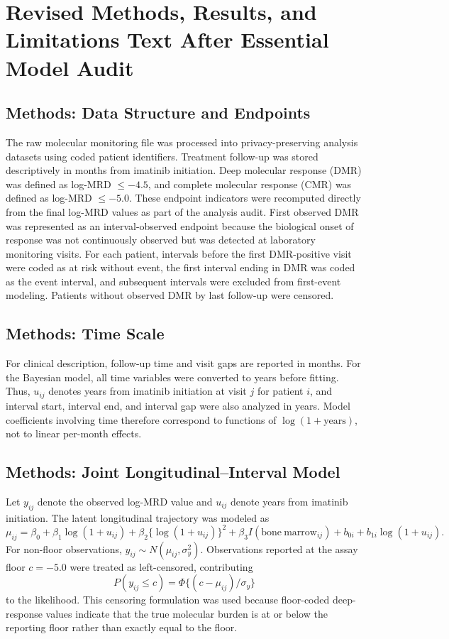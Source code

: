 \section*{Revised Methods, Results, and Limitations Text After Essential Model Audit}

\subsection*{Methods: Data Structure and Endpoints}

The raw molecular monitoring file was processed into privacy-preserving analysis datasets using coded patient identifiers. Treatment follow-up was stored descriptively in months from imatinib initiation. Deep molecular response (DMR) was defined as log-MRD \(\leq -4.5\), and complete molecular response (CMR) was defined as log-MRD \(\leq -5.0\). These endpoint indicators were recomputed directly from the final log-MRD values as part of the analysis audit. First observed DMR was represented as an interval-observed endpoint because the biological onset of response was not continuously observed but was detected at laboratory monitoring visits. For each patient, intervals before the first DMR-positive visit were coded as at risk without event, the first interval ending in DMR was coded as the event interval, and subsequent intervals were excluded from first-event modeling. Patients without observed DMR by last follow-up were censored.

\subsection*{Methods: Time Scale}

For clinical description, follow-up time and visit gaps are reported in months. For the Bayesian model, all time variables were converted to years before fitting. Thus, \(u_{ij}\) denotes years from imatinib initiation at visit \(j\) for patient \(i\), and interval start, interval end, and interval gap were also analyzed in years. Model coefficients involving time therefore correspond to functions of \(\log(1+\mathrm{years})\), not to linear per-month effects.

\subsection*{Methods: Joint Longitudinal--Interval Model}

Let \(y_{ij}\) denote the observed log-MRD value and \(u_{ij}\) denote years from imatinib initiation. The latent longitudinal trajectory was modeled as
\[
\mu_{ij} =
\beta_0 + \beta_1 \log(1+u_{ij})
+ \beta_2\{\log(1+u_{ij})\}^2
+ \beta_3 I(\mathrm{bone\ marrow}_{ij})
+ b_{0i} + b_{1i}\log(1+u_{ij}).
\]
For non-floor observations, \(y_{ij}\sim N(\mu_{ij},\sigma_y^2)\). Observations reported at the assay floor \(c=-5.0\) were treated as left-censored, contributing
\[
P(y_{ij}\le c)=\Phi\{(c-\mu_{ij})/\sigma_y\}
\]
to the likelihood. This censoring formulation was used because floor-coded deep-response values indicate that the true molecular burden is at or below the reporting floor rather than exactly equal to the floor.

